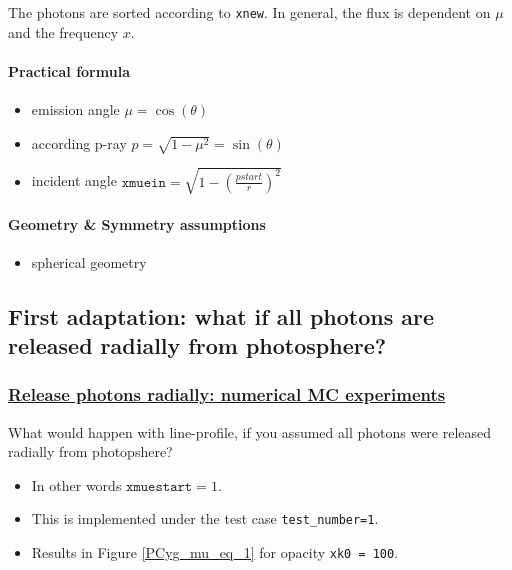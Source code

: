 \documentclass[../main/main.tex]{subfiles}
\begin{document}
\newpage
\begin{center}
\end{center}
The photons are sorted according to \texttt{xnew}.
In general, the flux is dependent on $\mu$ and the frequency $x$.


\paragraph{Practical formula}
\begin{itemize}
\item emission angle $\mu = \cos(\theta)$
\item according p-ray $p = \sqrt{1-\mu^2} = \sin(\theta)$
\item incident angle $\texttt{xmuein} = \sqrt{1-\left(\frac{pstart}{r}\right)^2}$
\end{itemize}

\paragraph{Geometry \& Symmetry assumptions}
\begin{itemize}
\item spherical geometry
\end{itemize}


\newpage
\subsection{First adaptation: what if all photons are released radially from photosphere?}
\label{PCYG FIRST adaptation}

\subsubsection{\underline{Release photons radially: numerical MC experiments}}
What would happen with line-profile, if you assumed all photons
were released radially from photopshere?
\begin{itemize}
\item In other words $\texttt{xmuestart} = 1$. 
\item This is implemented under the test case \texttt{test\_number=1}.
\item Results in Figure \ref{PCyg_mu_eq_1} for opacity \texttt{xk0 = 100}.
\end{itemize}
\end{document}
